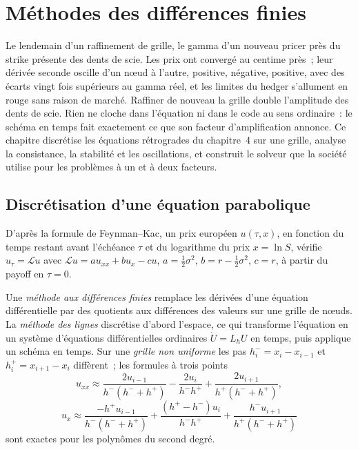 \chapter{Méthodes des différences finies}\label{ch:qm:finite-difference-methods}

Le lendemain d'un raffinement de grille, le gamma d'un nouveau pricer près du strike présente des dents de scie. Les prix ont convergé au centime près~; leur dérivée seconde oscille d'un nœud à l'autre,
positive, négative, positive, avec des écarts vingt fois supérieurs au gamma réel, et les limites du hedger s'allument en rouge sans raison de marché. Raffiner de nouveau la grille double l'amplitude des dents de scie. Rien
ne cloche dans l'équation ni dans le code au sens ordinaire~: le schéma en temps fait exactement ce que son facteur d'amplification annonce. Ce chapitre discrétise les équations rétrogrades
du chapitre~4 sur une grille, analyse la consistance, la stabilité et les oscillations, et construit le solveur que la société utilise pour les problèmes à un et à deux facteurs.

\section{Discrétisation d'une équation parabolique}

D'après la formule de Feynman--Kac, un prix européen $u(\tau, x)$, en fonction du temps restant avant l'échéance $\tau$ et du logarithme du prix $x = \ln S$, vérifie $u_\tau = \mathcal Lu$ avec $\mathcal Lu = au_{xx} + bu_x - cu$, $a =
\frac12\sigma^2$, $b = r - \frac12\sigma^2$, $c = r$, à partir du payoff en $\tau = 0$.

\begin{definition}\label{def:qm:finite-difference-methods:fd}
Une \emph{méthode aux différences finies} remplace les dérivées d'une équation différentielle par des quotients aux différences des valeurs sur une grille de nœuds. La \emph{méthode des
lignes} discrétise d'abord l'espace, ce qui transforme l'équation en un système d'équations différentielles ordinaires $\dot U = L_hU$ en temps, puis applique un schéma en temps. Sur une
\emph{grille non uniforme} les pas $h_i^- = x_i - x_{i-1}$ et $h_i^+ = x_{i+1} - x_i$ diffèrent~; les formules à trois points
\[u_{xx} \approx \frac{2u_{i-1}}{h^-(h^- + h^+)} - \frac{2u_i}{h^-h^+} + \frac{2u_{i+1}}{h^+(h^- + h^+)},\]
\[u_x \approx \frac{-h^+u_{i-1}}{h^-(h^- + h^+)} + \frac{(h^+ - h^-)u_i}{h^-h^+} + \frac{h^-u_{i+1}}{h^+(h^- + h^+)}\]
sont exactes pour les polynômes du second degré.
\end{definition}

